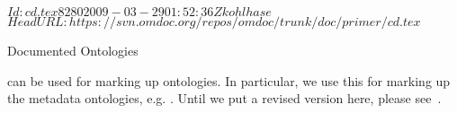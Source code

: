 \svnInfo $Id: cd.tex 8280 2009-03-29 01:52:36Z kohlhase $
\svnKeyword $HeadURL: https://svn.omdoc.org/repos/omdoc/trunk/doc/primer/cd.tex $

\begin{omgroup}[id=ontology,creators={miko,clange}]{Documented Ontologies}

  {\omdoc} can be used for marking up ontologies. In particular, we use this for marking
  up the metadata ontologies, e.g. {}. Until we put a revised
  version here, please see~\cite{LK:MathOntoAuthDoc09}.
\end{omgroup}

